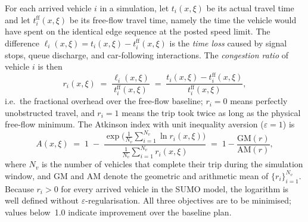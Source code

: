 \documentclass[12pt]{article}
\theoremstyle{plain}
\theoremstyle{definition}
\theoremstyle{remark}
\begin{document}
For each arrived vehicle $i$ in a simulation, let
$t_{i}(x,\xi)$ be its actual travel time and let
$t_{i}^{\mathrm{ff}}(x,\xi)$ be its free-flow travel time, namely the
time the vehicle would have spent on the identical edge sequence at the
posted speed limit.  The difference
$\ell_{i}(x,\xi) = t_{i}(x,\xi) - t_{i}^{\mathrm{ff}}(x,\xi)$ is the
\emph{time loss} caused by signal stops, queue discharge, and
car-following interactions.  The \emph{congestion ratio} of vehicle $i$
is then
\begin{equation}\label{eq:congestion_ratio}
  r_{i}(x,\xi) \;=\; \frac{\ell_{i}(x,\xi)}{t_{i}^{\mathrm{ff}}(x,\xi)}
  \;=\; \frac{t_{i}(x,\xi) - t_{i}^{\mathrm{ff}}(x,\xi)}{t_{i}^{\mathrm{ff}}(x,\xi)},
\end{equation}
i.e.\ the fractional overhead over the free-flow baseline; $r_{i}=0$
means perfectly unobstructed travel, and $r_{i}=1$ means the trip took
twice as long as the physical free-flow minimum.  The Atkinson index
with unit inequality aversion ($\varepsilon=1$) is
\begin{equation}\label{eq:atkinson}
  A(x,\xi) \;=\; 1 \;-\;
  \frac{\exp\!\bigl(\tfrac{1}{N_{v}}\textstyle\sum_{i=1}^{N_{v}}\ln r_{i}(x,\xi)\bigr)}
       {\tfrac{1}{N_{v}}\textstyle\sum_{i=1}^{N_{v}} r_{i}(x,\xi)}
  \;=\; 1 - \frac{\mathrm{GM}(r)}{\mathrm{AM}(r)},
\end{equation}
where $N_{v}$ is the number of vehicles that complete their trip
during the simulation window, and $\mathrm{GM}$ and $\mathrm{AM}$ denote
the geometric and arithmetic mean of
$\{r_{i}\}_{i=1}^{N_{v}}$.  Because $r_{i}>0$ for every arrived
vehicle in the SUMO model, the logarithm is well defined without
$\varepsilon$-regularisation.  All three objectives are to be minimised;
values below~1.0 indicate improvement over the baseline plan.
\end{document}
